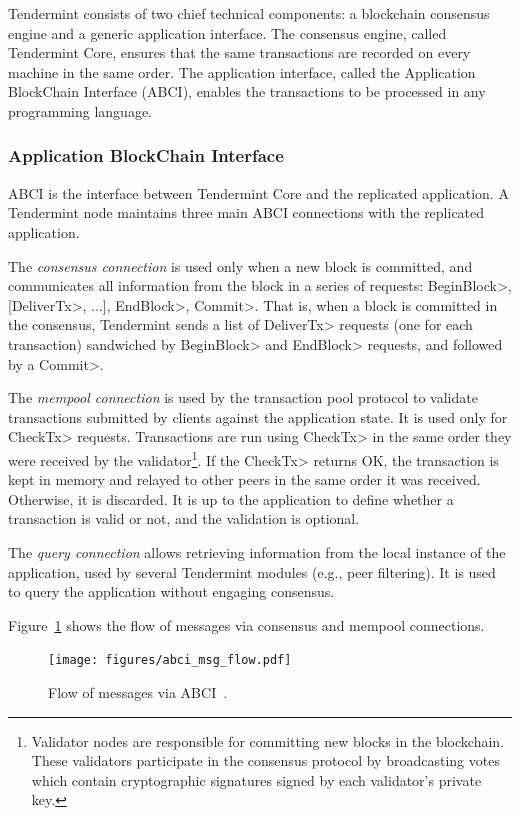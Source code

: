 %

Tendermint consists of two chief technical components: a blockchain consensus engine and a
generic application interface.
%
The consensus engine, called Tendermint Core, ensures that the same transactions are recorded
on every machine in the same order.
%
The application interface, called the Application BlockChain Interface (ABCI), enables the
transactions to be processed in any programming language.
%

\subsubsection{Application BlockChain Interface}
ABCI is the interface between Tendermint Core
and the replicated application.
%
A Tendermint node maintains three main ABCI connections with the replicated application.
%

The \textit{consensus connection} is used only when a new block is committed,
and communicates all information from the block in a series of 
requests: \<BeginBlock>, [\<DeliverTx>, ...], \<EndBlock>, \<Commit>.
%
That is, when a block is committed in the consensus, Tendermint sends a 
list of \<DeliverTx> requests (one for each transaction) sandwiched by 
\<BeginBlock> and \<EndBlock> requests, and followed by a \<Commit>.

%

The \textit{mempool connection} is used by the transaction
pool protocol to validate transactions submitted
by clients against the application state. 
%
It is used only for \<CheckTx> requests. Transactions
are run using \<CheckTx> in the same order they were received
by the validator\footnote{Validator nodes are responsible for committing new blocks in the blockchain. These validators participate in the consensus protocol by broadcasting votes which contain cryptographic signatures signed by each validator's private key.}. If the \<CheckTx> returns OK, the transaction
is kept in memory and relayed to other peers in the same order
it was received. Otherwise, it is discarded.
%
It is up to the application to define whether a transaction is valid or not, and
the validation is optional. 

%

The \textit{query connection} allows retrieving information
from the local instance of the application, used by several
Tendermint modules (e.g., peer filtering).
%
It is used to query the application without engaging consensus. 

Figure~\ref{fig:abci_flow} shows the flow of messages via consensus and mempool connections.
%

\begin{figure}
  \centering
  \texttt{[image: figures/abci\_msg\_flow.pdf]}
  \caption{Flow of messages via ABCI~\cite{tendermint.site}.}
  \label{fig:abci_flow}
\end{figure}


